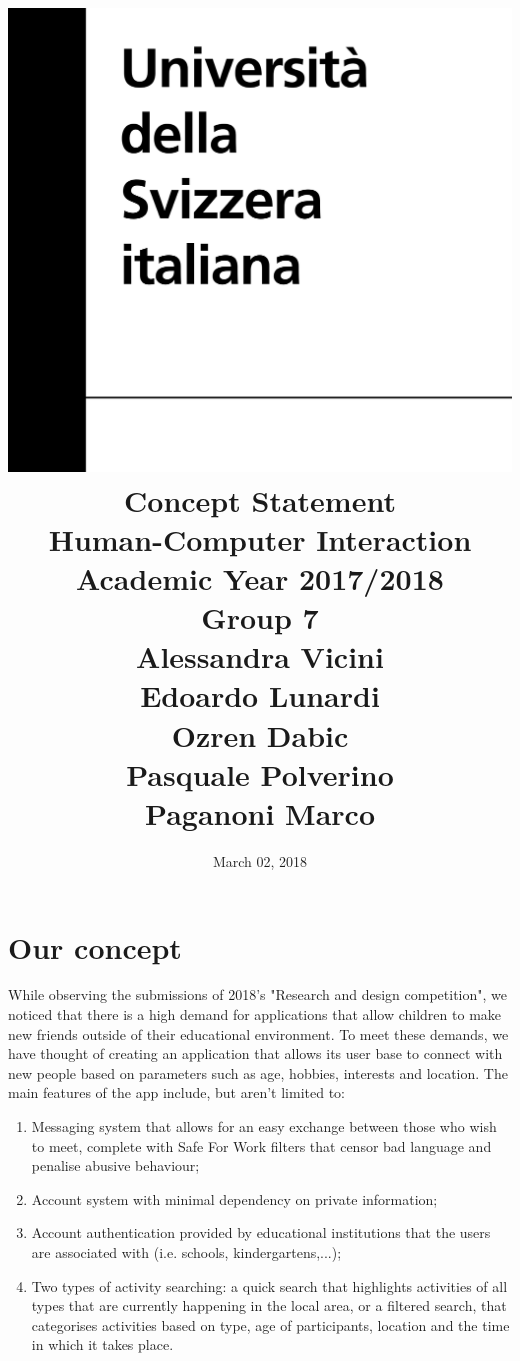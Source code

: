 \documentclass[12pt]{article}
\title {
	\includegraphics[width = .2\linewidth]{University-of-Lugano.png} \break \break
	{\bf\Huge Concept Statement}
	\\\large Human-Computer Interaction
	\\\small Academic Year 2017/2018 \break
	\\\large \textbf{Group 7}
	\\\large Alessandra Vicini \\ Edoardo Lunardi \\ Ozren Dabic \\ Pasquale Polverino \\ Paganoni Marco}
\date{March 02, 2018}
\begin{document}
	\maketitle
	\newpage
	\thispagestyle{empty}
	\part*{Our concept}
		While observing the submissions of 2018's "Research and design competition",
		we noticed that there is a high demand for applications that allow children
	 	to make new friends outside of their educational environment. To meet these
	  demands, we have thought of creating an application that allows its user base
		to connect with new people based on parameters such as age, hobbies, interests
		and location. The main features of the app include, but aren't limited to:
	\begin{enumerate}
		\item Messaging system that allows for an easy exchange between those who wish
		 			to meet, complete with Safe For Work filters that censor bad language and
		  		penalise abusive behaviour;
		\item Account system with minimal dependency on private information;
		\item Account authentication provided by educational institutions that the
					users are associated with (i.e. schools, kindergartens,...);
		\item Two types of activity searching: a quick search that highlights activities
		 			of all types that are currently happening in the local area, or a filtered
		  		search, that categorises activities based on type, age of participants,
			 		location and the time in which it takes place.
	\end{enumerate}

	
\end{document}
